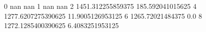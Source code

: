 0 nan nan
1 nan nan
2 1451.312255859375 185.592041015625
4 1277.6207275390625 11.9005126953125
6 1265.72021484375 0.0
8 1272.1285400390625 6.4083251953125
